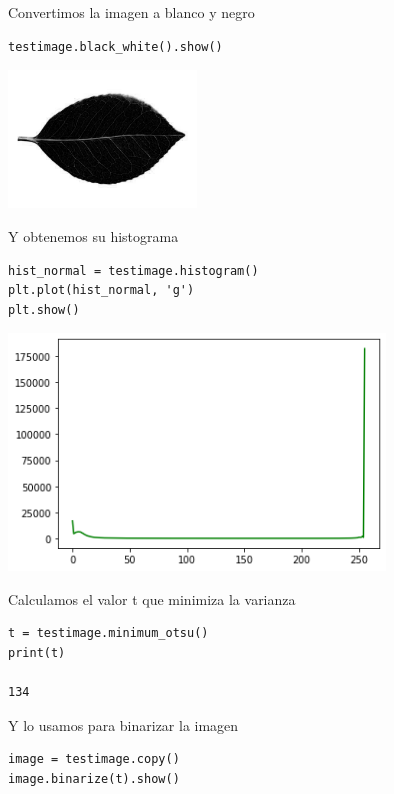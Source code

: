 \documentclass[letter]{article}
\begin{document}
Convertimos la imagen a blanco y negro

\begin{verbatim}
testimage.black_white().show()

\end{verbatim}

\begin{center}
\includegraphics[width=5cm]{./images/testbn.png}
\end{center}

Y obtenemos su histograma

\begin{verbatim}
hist_normal = testimage.histogram()
plt.plot(hist_normal, 'g')
plt.show()
\end{verbatim}

\begin{center}
\includegraphics[width=10cm]{./images/hist.png}
\end{center}

Calculamos el valor t que minimiza la varianza

\begin{verbatim}
t = testimage.minimum_otsu()
print(t)

134
\end{verbatim}

Y lo usamos para binarizar la imagen

\begin{verbatim}
image = testimage.copy()
image.binarize(t).show()
\end{verbatim}
\end{document}
